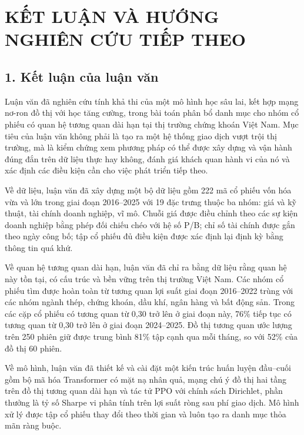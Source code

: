 \chapter*{KẾT LUẬN VÀ HƯỚNG NGHIÊN CỨU TIẾP THEO}

\section*{1. Kết luận của luận văn}

Luận văn đã nghiên cứu tính khả thi của một mô hình học sâu lai, kết hợp mạng nơ-ron đồ thị với học tăng cường, trong bài toán phân bổ danh mục cho nhóm cổ phiếu có quan hệ tương quan dài hạn tại thị trường chứng khoán Việt Nam. Mục tiêu của luận văn không phải là tạo ra một hệ thống giao dịch vượt trội thị trường, mà là kiểm chứng xem phương pháp có thể được xây dựng và vận hành đúng đắn trên dữ liệu thực hay không, đánh giá khách quan hành vi của nó và xác định các điều kiện cần cho việc phát triển tiếp theo.

Về dữ liệu, luận văn đã xây dựng một bộ dữ liệu gồm 222 mã cổ phiếu vốn hóa vừa và lớn trong giai đoạn 2016--2025 với 19 đặc trưng thuộc ba nhóm: giá và kỹ thuật, tài chính doanh nghiệp, vĩ mô. Chuỗi giá được điều chỉnh theo các sự kiện doanh nghiệp bằng phép đối chiếu chéo với hệ số P/B; chỉ số tài chính được gắn theo ngày công bố; tập cổ phiếu đủ điều kiện được xác định lại định kỳ bằng thông tin quá khứ.

Về quan hệ tương quan dài hạn, luận văn đã chỉ ra bằng dữ liệu rằng quan hệ này tồn tại, có cấu trúc và bền vững trên thị trường Việt Nam. Các nhóm cổ phiếu tìm được hoàn toàn từ tương quan lợi suất giai đoạn 2016--2022 trùng với các nhóm ngành thép, chứng khoán, dầu khí, ngân hàng và bất động sản. Trong các cặp cổ phiếu có tương quan từ 0,30 trở lên ở giai đoạn này, 76\% tiếp tục có tương quan từ 0,30 trở lên ở giai đoạn 2024--2025. Đồ thị tương quan ước lượng trên 250 phiên giữ được trung bình 81\% tập cạnh qua mỗi tháng, so với 52\% của đồ thị 60 phiên.

Về mô hình, luận văn đã thiết kế và cài đặt một kiến trúc huấn luyện đầu--cuối gồm bộ mã hóa Transformer có mặt nạ nhân quả, mạng chú ý đồ thị hai tầng trên đồ thị tương quan dài hạn và tác tử PPO với chính sách Dirichlet, phần thưởng là tỷ số Sharpe vi phân tính trên lợi suất ròng sau phí giao dịch. Mô hình xử lý được tập cổ phiếu thay đổi theo thời gian và luôn tạo ra danh mục thỏa mãn ràng buộc.

